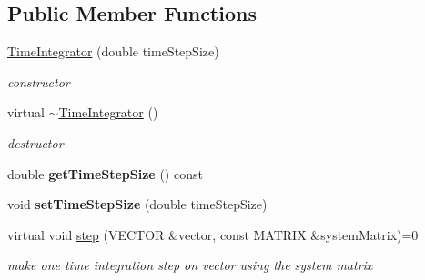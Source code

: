 \subsection*{Public Member Functions}
\begin{DoxyCompactItemize}
\item 
\hypertarget{classnatrium_1_1TimeIntegrator_a420ea9baabf0839bc8ecb5f5e02ce95b}{\hyperlink{classnatrium_1_1TimeIntegrator_a420ea9baabf0839bc8ecb5f5e02ce95b}{Time\-Integrator} (double time\-Step\-Size)}\label{classnatrium_1_1TimeIntegrator_a420ea9baabf0839bc8ecb5f5e02ce95b}

\begin{DoxyCompactList}\small\item\em constructor \end{DoxyCompactList}\item 
\hypertarget{classnatrium_1_1TimeIntegrator_a8795d06c5322b72a5a2a1f30aa7a051d}{virtual \hyperlink{classnatrium_1_1TimeIntegrator_a8795d06c5322b72a5a2a1f30aa7a051d}{$\sim$\-Time\-Integrator} ()}\label{classnatrium_1_1TimeIntegrator_a8795d06c5322b72a5a2a1f30aa7a051d}

\begin{DoxyCompactList}\small\item\em destructor \end{DoxyCompactList}\item 
\hypertarget{classnatrium_1_1TimeIntegrator_a6e763133e114cdd758307ca30b65f161}{double {\bfseries get\-Time\-Step\-Size} () const }\label{classnatrium_1_1TimeIntegrator_a6e763133e114cdd758307ca30b65f161}

\item 
\hypertarget{classnatrium_1_1TimeIntegrator_a18592866e946c63ab1595d3ab688ea6b}{void {\bfseries set\-Time\-Step\-Size} (double time\-Step\-Size)}\label{classnatrium_1_1TimeIntegrator_a18592866e946c63ab1595d3ab688ea6b}

\item 
\hypertarget{classnatrium_1_1TimeIntegrator_ad3888242580c257058d8d6f8ddeb2c5d}{virtual void \hyperlink{classnatrium_1_1TimeIntegrator_ad3888242580c257058d8d6f8ddeb2c5d}{step} (V\-E\-C\-T\-O\-R \&vector, const M\-A\-T\-R\-I\-X \&system\-Matrix)=0}\label{classnatrium_1_1TimeIntegrator_ad3888242580c257058d8d6f8ddeb2c5d}

\begin{DoxyCompactList}\small\item\em make one time integration step on vector using the system matrix \end{DoxyCompactList}\end{DoxyCompactItemize}


